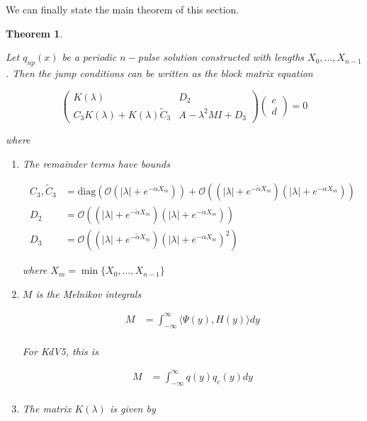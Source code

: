 \documentclass[12pt]{article}
\newtheorem{theorem}{Theorem}
\begin{document}
We can finally state the main theorem of this section.

\begin{theorem}\label{blockmatrixform}

Let $q_{np}(x)$ be a periodic $n-$pulse solution constructed with lengths $X_0, \dots, X_{n-1}$. Then the jump conditions can be written as the block matrix equation 

\begin{equation}\label{blockeq}
\begin{pmatrix}
K(\lambda) & D_2 \\
C_3 K(\lambda) + K(\lambda) \tilde{C}_3 & A - \lambda^2 MI + D_3
\end{pmatrix}
\begin{pmatrix}c \\ d \end{pmatrix} 
= 0
\end{equation}

where 

\begin{enumerate}

\item The remainder terms have bounds

\begin{align*}
C_3, \tilde{C}_3 &= \text{diag}(\mathcal{O}(|\lambda| + e^{-\alpha X_m})) 
+ \mathcal{O}((|\lambda| + e^{-\tilde{\alpha} X_m})( |\lambda| + e^{-\alpha X_m})) \\
D_2 &= \mathcal{O}((|\lambda| + e^{-\tilde{\alpha} X_m})(|\lambda| + e^{-\alpha X_m})) \\
D_3 &= \mathcal{O}((|\lambda| + e^{-\tilde{\alpha} X_m})(|\lambda| + e^{-\alpha X_m})^2)
\end{align*}

where $X_m = \min \{X_0, \dots, X_{n-1}\}$

\item $M$ is the Melnikov integrals

\begin{align*}
M &= \int_{-\infty}^\infty \langle \Psi(y), H(y) \rangle dy \\
\end{align*}

For KdV5, this is

\begin{align*}
M &= \int_{-\infty}^\infty q(y) q_c(y) dy \\
\end{align*}

\item The matrix $K(\lambda)$ is given by


\end{enumerate}
\end{theorem}
\end{document}
